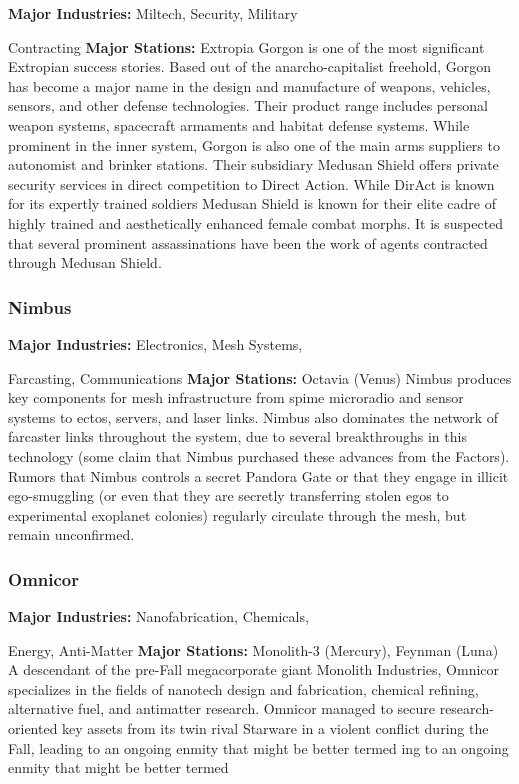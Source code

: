 \textbf{Major Industries:} Miltech, Security, Military 

Contracting
\textbf{Major Stations:} Extropia
Gorgon is one of the most significant  Extropian 
success stories. Based out of the anarcho-capitalist 
freehold, Gorgon has become a major name in the 
design and manufacture of weapons, vehicles, sensors, 
and other defense technologies. Their product range 
includes personal weapon systems, spacecraft armaments
and habitat defense systems. While prominent
in the inner system, Gorgon is also one of the main 
arms suppliers to autonomist and brinker stations. 
Their subsidiary Medusan Shield offers private security
services in direct competition to Direct Action.
While DirAct is known for its expertly trained soldiers
Medusan Shield is known for their elite cadre
of highly trained and aesthetically enhanced female 
combat morphs. It is suspected that several prominent
assassinations have been the work of agents
contracted through Medusan Shield.

\subsubsection{Nimbus}

\textbf{Major Industries:} Electronics, Mesh Systems, 

Farcasting, Communications
\textbf{Major Stations:} Octavia (Venus)
Nimbus produces key components for mesh infrastructure
from spime microradio and sensor systems
to ectos, servers, and laser links. Nimbus also
dominates the network of farcaster links throughout 
the system, due to several breakthroughs in this technology
(some claim that Nimbus purchased these
advances from the Factors). Rumors that Nimbus 
controls a secret Pandora Gate or that they engage 
in illicit ego-smuggling (or even that they are secretly 
transferring stolen egos to experimental exoplanet 
colonies) regularly circulate through the mesh, but 
remain unconfirmed.

\subsubsection{Omnicor}

\textbf{Major Industries:} Nanofabrication, Chemicals, 

Energy, Anti-Matter
\textbf{Major Stations:} Monolith-3 (Mercury), Feynman (Luna)
A descendant of the pre-Fall megacorporate giant 
Monolith Industries, Omnicor specializes in the fields 
of nanotech design and fabrication, chemical refining, 
alternative fuel, and antimatter research. Omnicor managed
to secure research-oriented key assets from its twin
rival Starware in a violent conflict during the Fall, leading
to an ongoing enmity that might be better termed
ing to an ongoing enmity that might be better termed

